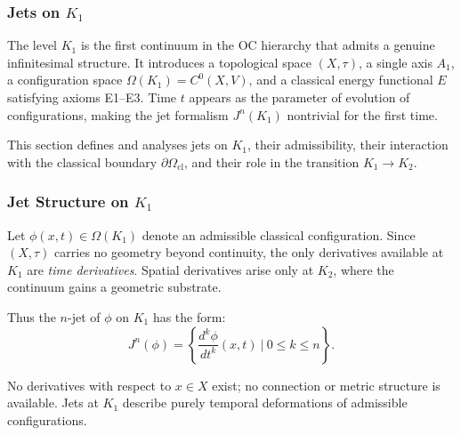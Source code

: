 
\subsubsection{Jets on \texorpdfstring{$K_1$}{K_1}}
\label{sec:jets-k1}

The level $K_1$ is the first continuum in the OC hierarchy that admits
a genuine infinitesimal structure. It introduces a topological space
$(X,\tau)$, a single axis $A_1$, a configuration space
$\Omega(K_1)=C^0(X,V)$, and a classical energy functional $E$ satisfying
axioms E1--E3. Time $t$ appears as the parameter of evolution of
configurations, making the jet formalism $J^n(K_1)$ nontrivial for the
first time.

This section defines and analyses jets on $K_1$, their admissibility,
their interaction with the classical boundary $\partial\Omega_{\mathrm{cl}}$,
and their role in the transition $K_1\to K_2$.



\subsubsection{Jet Structure on \texorpdfstring{\texorpdfstring{$K_1$}{K_1}}{K1}}

Let $\phi(x,t)\in\Omega(K_1)$ denote an admissible classical
configuration. Since $(X,\tau)$ carries no geometry beyond continuity,
the only derivatives available at $K_1$ are \emph{time derivatives}.
Spatial derivatives arise only at $K_2$, where the continuum gains a
geometric substrate.

Thus the $n$-jet of $\phi$ on $K_1$ has the form:
\[
J^n(\phi)
=
\left\{
\frac{d^k\phi}{dt^k}(x,t)
\ \bigg|\ 
0 \le k \le n
\right\}.
\]

No derivatives with respect to $x\in X$ exist; no connection or metric
structure is available. Jets at $K_1$ describe purely temporal
deformations of admissible configurations.



